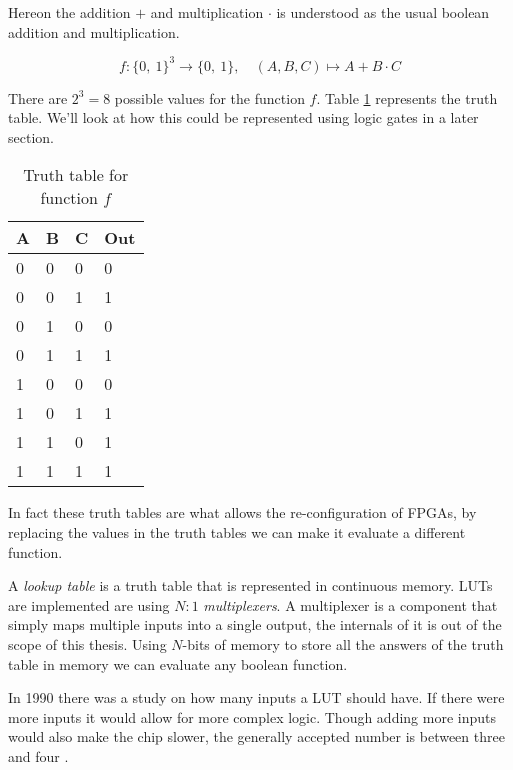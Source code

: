 \begin{example}
    \label{ex:boolean_function}

    Hereon the addition $+$ and multiplication $\cdot$ is understood as the
    usual boolean addition and multiplication.

    \[
    f \colon \{0,\ 1\}^3 \rightarrow \{0,\ 1\}, \quad (A, B, C) \mapsto A + B \cdot C
    \]

    There are $2^3 = 8$ possible values for the function $f$. Table
    \ref{tab:example_truth_table} represents the truth table. We'll look at how
    this could be represented using logic gates in a later section.
    \begin{table}[H]
        \centering
        \begin{tabular}{|l|l|l|l|}
            \hline
            A & B & C & Out \\ \hline
            0 & 0 & 0 & 0   \\ \hline
            0 & 0 & 1 & 1   \\ \hline
            0 & 1 & 0 & 0   \\ \hline
            0 & 1 & 1 & 1   \\ \hline
            1 & 0 & 0 & 0   \\ \hline
            1 & 0 & 1 & 1   \\ \hline
            1 & 1 & 0 & 1   \\ \hline
            1 & 1 & 1 & 1   \\ \hline
        \end{tabular}
        \caption{Truth table for function $f$}
        \label{tab:example_truth_table}
    \end{table}


    In fact these truth tables are what allows the re-configuration of FPGAs, by
    replacing the values in the truth tables we can make it evaluate a different
    function.
\end{example}

\begin{definition}

    A \textit{lookup table} is a truth table that is represented in continuous
    memory. LUTs are implemented are using $N:1$ \textit{multiplexers}. A
    multiplexer is a component that simply maps multiple inputs into a single
    output, the internals of it is out of the scope of this thesis. Using $N$-bits
    of memory to store all the answers of the truth table in memory we can evaluate
    any boolean function.

    In 1990 there was a study on how many inputs a LUT should have. If
    there were more inputs it would allow for more complex logic. Though adding more
    inputs would also make the chip slower, the generally accepted number is
    between three and four \citep{RoseArchitecture}.

\end{definition}

